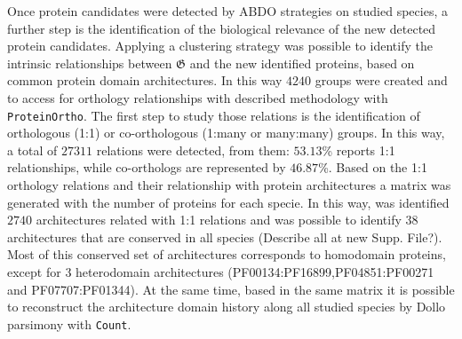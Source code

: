 \documentclass[11pt]{article}
\newcommand{\TODO}[1]{\begingroup\color{red}#1\endgroup}
\begin{document}
Once protein candidates were detected by ABDO strategies on studied species, 
a further step is the identification of the biological relevance of the 
new detected protein candidates. Applying a clustering strategy was
possible to identify the intrinsic relationships between 
$\boldsymbol{\mathfrak{G}}$ and the new identified proteins, based on common 
protein domain architectures. In this way $4240$ groups were created and to 
access for orthology relationships with described methodology with \texttt{ProteinOrtho}.
The first step to study those relations is the identification of orthologous (1:1) 
or co-orthologous (1:many or many:many) groups. In this way, a total of $27311$ 
relations were detected, from them: $53.13$\% reports 1:1 relationships, while
co-orthologs are represented by $46.87$\%. Based on the 1:1 orthology relations and 
their relationship with protein architectures a matrix was generated with the number 
of proteins for each specie. In this way, was identified $2740$ architectures related
with 1:1 relations and was possible to identify $38$ architectures
that are conserved in all species (\TODO{Describe all at new Supp. File?}). 
Most of this conserved set of architectures corresponds to homodomain proteins, 
except for $3$ heterodomain architectures (PF00134:PF16899,PF04851:PF00271 
and PF07707:PF01344). At the same time, based in the same matrix it is possible 
to reconstruct the architecture domain history along all studied species by Dollo 
parsimony \cite{} with \texttt{Count}\cite{csuros2010}. 
\end{document}
